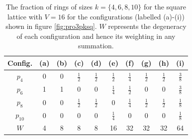 \begin{table}[bt]
\centering
     \caption{The fraction of rings of sizes $k=\{4,6,8,10\}$ for the square lattice
with $V=16$ for the configurations (labelled (a)-(i)) shown in figure 
\ref{fig:pro3pksq}. $W$ represents the degeneracy of each configuration and hence its weighting in any
summation.}
\label{tab:sqV16}

     \begin{tabular}{cccccccccc}
     \toprule
      Config. & (a) & (b) & (c) & (d) & (e) & (f) & (g) & (h) & (i)\\
     \midrule
	$p_4$ & 0 & 0 & $\frac{1}{2}$ & $\frac{1}{2}$ & $\frac{1}{2}$ & $\frac{1}{4}$ & $\frac{1}{2}$ & $\frac{1}{2}$ & $\frac{3}{8}$ \\[0.5em]
		$p_6$ & 1 & 1 & 0 & 0 & $\frac{1}{4}$ & $\frac{1}{2}$ & 0 & 0 & $\frac{3}{8}$ \\[0.5em] 
		$p_8$ & 0 & 0 & $\frac{1}{2}$ & $\frac{1}{2}$ & 0 & $\frac{1}{4}$ & $\frac{1}{2}$ & $\frac{1}{2}$ & $\frac{1}{8}$ \\[0.5em]
		$p_{10}$ & 0 & 0 & 0 & 0 & $\frac{1}{4}$ & 0 & 0 & 0 & $\frac{1}{8}$ \\[0.5em]
		$W$ & 4 & 8 & 8 & 8 & 16 & 32 & 32 & 32 & 64 \\
     \bottomrule     
     
     \end{tabular}
\end{table}

